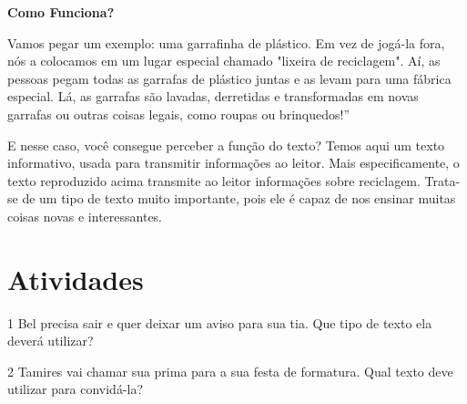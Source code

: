 {\begin{center}
\textbf{Como Funciona?}

Vamos pegar um exemplo: uma garrafinha de plástico. Em vez de jogá-la fora, nós a colocamos em um lugar especial chamado "lixeira de reciclagem". Aí, as pessoas pegam todas as garrafas de plástico juntas e as levam para uma fábrica especial. Lá, as garrafas são lavadas, derretidas e transformadas em novas garrafas ou outras coisas legais, como roupas ou brinquedos!''
\end{center}
E nesse caso, você consegue perceber a função do texto? Temos aqui um texto informativo, usada para transmitir informações ao leitor. Mais especificamente, o texto reproduzido acima transmite ao leitor informações sobre reciclagem. Trata-se de um tipo de texto muito importante, pois ele é capaz de nos ensinar muitas coisas novas e interessantes.

}


\section*{Atividades}

\num{1} Bel precisa sair e quer deixar um aviso para sua tia. 
Que tipo de texto ela deverá utilizar?






\num{2} Tamires vai chamar sua prima para a sua festa de formatura.
Qual texto deve utilizar para convidá-la?


